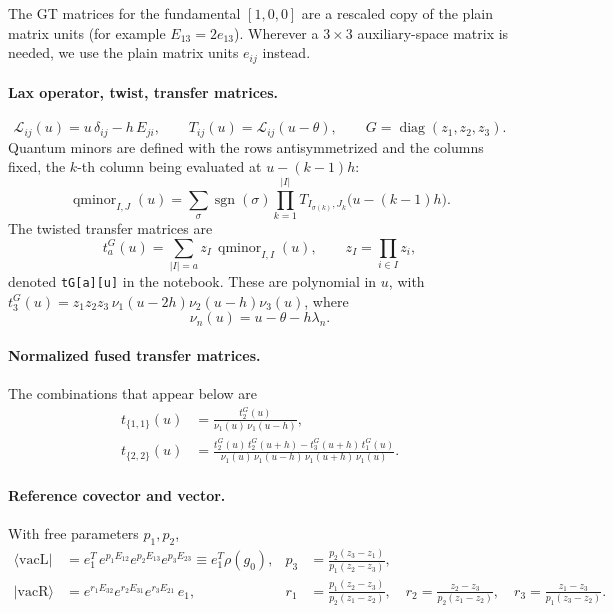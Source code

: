 \documentclass[11pt]{article}
\newcommand{\vacL}{\langle\mathrm{vacL}|}
\newcommand{\vacR}{|\mathrm{vacR}\rangle}
\newcommand{\qmin}{\operatorname{qminor}}
\newcommand{\nb}[1]{\texttt{#1}}
\theoremstyle{definition}
\theoremstyle{remark}
\begin{document}
The GT matrices for the fundamental $[1,0,0]$ are a rescaled copy of the plain matrix units (for example $E_{13}=2e_{13}$). Wherever a $3\times3$ auxiliary-space matrix is needed, we use the plain matrix units $e_{ij}$ instead.

\paragraph{Lax operator, twist, transfer matrices.}
\begin{equation}
\mathcal L_{ij}(u)=u\,\delta_{ij}-h\,E_{ji},\qquad T_{ij}(u)=\mathcal L_{ij}(u-\theta),\qquad G=\operatorname{diag}(z_1,z_2,z_3).
\end{equation}
Quantum minors are defined with the rows antisymmetrized and the columns fixed, the $k$-th column being evaluated at $u-(k-1)h$:
\begin{equation}
\qmin_{I,J}(u)=\sum_{\sigma}\operatorname{sgn}(\sigma)\prod_{k=1}^{|I|}T_{I_{\sigma(k)},J_k}\big(u-(k-1)h\big).
\end{equation}
The twisted transfer matrices are
\begin{equation}
t^G_a(u)=\sum_{|I|=a}z_I\,\qmin_{I,I}(u),\qquad z_I=\prod_{i\in I}z_i,
\end{equation}
denoted \nb{tG[a][u]} in the notebook. These are polynomial in $u$, with $t^G_3(u)=z_1z_2z_3\,\nu_1(u-2h)\nu_2(u-h)\nu_3(u)$, where
\begin{equation}
\nu_n(u)=u-\theta-h\lambda_n .
\end{equation}

\paragraph{Normalized fused transfer matrices.}
The combinations that appear below are
\begin{align}
t_{\{1,1\}}(u)&=\frac{t^G_2(u)}{\nu_1(u)\,\nu_1(u-h)},\\
t_{\{2,2\}}(u)&=\frac{t^G_2(u)\,t^G_2(u+h)-t^G_3(u+h)\,t^G_1(u)}{\nu_1(u)\,\nu_1(u-h)\,\nu_1(u+h)\,\nu_1(u)} .
\end{align}

\paragraph{Reference covector and vector.}
With free parameters $p_1,p_2$,
\begin{align}
\vacL&=e_1^T\,e^{p_1E_{12}}e^{p_2E_{13}}e^{p_3E_{23}}\equiv e_1^T\rho(g_0),&
p_3&=\frac{p_2(z_3-z_1)}{p_1(z_2-z_3)},\\
\vacR&=e^{r_1E_{32}}e^{r_2E_{31}}e^{r_3E_{21}}\,e_1,&
r_1&=\frac{p_1(z_2-z_3)}{p_2(z_1-z_2)},\quad r_2=\frac{z_2-z_3}{p_2(z_1-z_2)},\quad r_3=\frac{z_1-z_3}{p_1(z_3-z_2)} .
\end{align}
\end{document}
